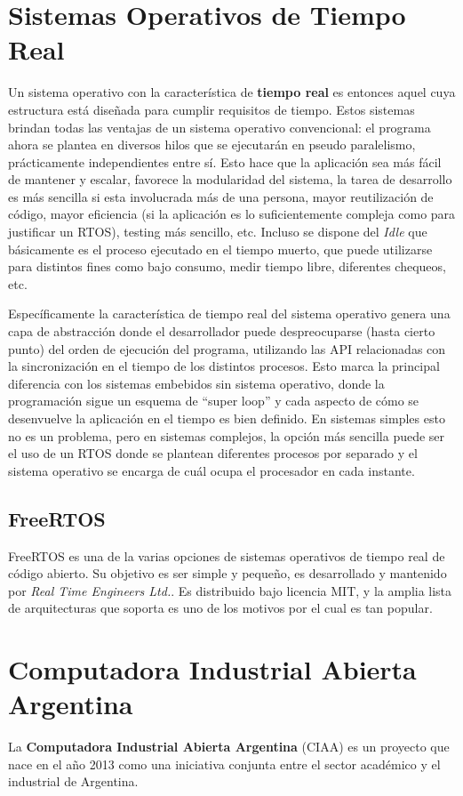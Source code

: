 \documentclass{IEEEtran}
\begin{document}
\section{Sistemas Operativos de Tiempo Real}
Un sistema operativo con la característica de \textbf{tiempo real} es entonces aquel cuya estructura está diseñada para cumplir requisitos de tiempo. Estos sistemas brindan todas las ventajas de un sistema operativo convencional: el programa ahora se plantea en diversos hilos que se ejecutarán en pseudo paralelismo, prácticamente independientes entre sí. Esto hace que la aplicación sea más fácil de mantener y escalar, favorece la modularidad del sistema, la tarea de desarrollo es más sencilla si esta involucrada más de una persona, mayor reutilización de código, mayor eficiencia (si la aplicación es lo suficientemente compleja como para justificar un RTOS), testing más sencillo, etc. Incluso se dispone del \textit{Idle} que básicamente es el proceso ejecutado en el tiempo muerto, que puede utilizarse para distintos fines como bajo consumo, medir tiempo libre, diferentes chequeos, etc.

Específicamente la característica de tiempo real del sistema operativo genera una capa de abstracción donde el desarrollador puede despreocuparse (hasta cierto punto) del orden de ejecución del programa, utilizando las API relacionadas con la sincronización en el tiempo de los distintos procesos. Esto marca la principal diferencia con los sistemas embebidos sin sistema operativo, donde la programación sigue un esquema de ``super loop'' y cada aspecto de cómo se desenvuelve la aplicación en el tiempo es bien definido. En sistemas simples esto no es un problema, pero en sistemas complejos, la opción más sencilla puede ser el uso de un RTOS donde se plantean diferentes procesos por separado y el sistema operativo se encarga de cuál ocupa el procesador en cada instante.

\subsection{FreeRTOS}
FreeRTOS es una de la varias opciones de sistemas operativos de tiempo real de código abierto. Su objetivo es ser simple y pequeño, es desarrollado y mantenido por \textit{Real Time Engineers Ltd.}. Es distribuido bajo licencia MIT, y la amplia lista de arquitecturas que soporta es uno de los motivos por el cual es tan popular.

\section{Computadora Industrial Abierta Argentina}
La \textbf{Computadora Industrial Abierta Argentina} (CIAA) es un proyecto que nace en el año 2013 como una iniciativa conjunta entre el sector académico y el industrial de Argentina.
\end{document}
